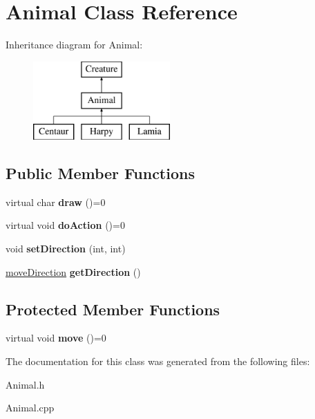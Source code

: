 \hypertarget{class_animal}{}\section{Animal Class Reference}
\label{class_animal}
Inheritance diagram for Animal\+:\begin{figure}[H]
\begin{center}
\leavevmode
\includegraphics[height=3.000000cm]{class_animal}
\end{center}
\end{figure}
\subsection*{Public Member Functions}
\begin{DoxyCompactItemize}
\item 
virtual char {\bfseries draw} ()=0\hypertarget{class_animal_a66c6953f374456d286aa7ae3ab0b80a0}{}\label{class_animal_a66c6953f374456d286aa7ae3ab0b80a0}

\item 
virtual void {\bfseries do\+Action} ()=0\hypertarget{class_animal_a997961a1ecd5c6e0529d8768521b58a9}{}\label{class_animal_a997961a1ecd5c6e0529d8768521b58a9}

\item 
void {\bfseries set\+Direction} (int, int)\hypertarget{class_animal_aee564f22d8d74725c7f718ae5fcf2cd9}{}\label{class_animal_aee564f22d8d74725c7f718ae5fcf2cd9}

\item 
\hyperlink{structmove_direction}{move\+Direction} {\bfseries get\+Direction} ()\hypertarget{class_animal_a64d1215d871925e471b94b35ab1f8795}{}\label{class_animal_a64d1215d871925e471b94b35ab1f8795}

\end{DoxyCompactItemize}
\subsection*{Protected Member Functions}
\begin{DoxyCompactItemize}
\item 
virtual void {\bfseries move} ()=0\hypertarget{class_animal_a0b36674071f5144d1e33507b8b90c87d}{}\label{class_animal_a0b36674071f5144d1e33507b8b90c87d}

\end{DoxyCompactItemize}


The documentation for this class was generated from the following files\+:\begin{DoxyCompactItemize}
\item 
Animal.\+h\item 
Animal.\+cpp\end{DoxyCompactItemize}
